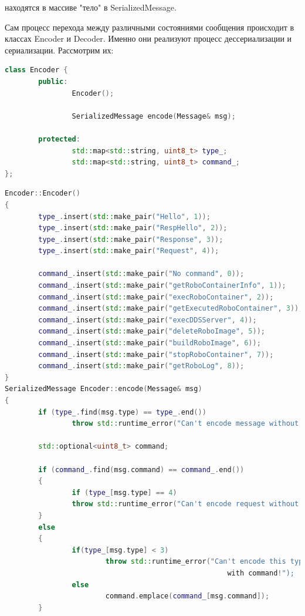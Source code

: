 \documentclass[a4paper, 14pt]{extreport}
\begin{document}
находятся в массиве "тело" в SerializedMessage.
\par Сам процесс перехода между различными состояниями сообщения происходит в классах Encoder и Decoder. Именно они реализуют процесс 
дессериализации и сериализации. Рассмотрим их:
\begin{lstlisting}[language=C++, frame=single, xleftmargin=15pt, caption={Заголовочный файл класса Encoder},label=DescriptiveLabel]
class Encoder {
        public:
                Encoder();
        
                SerializedMessage encode(Message& msg);
        
        protected:
                std::map<std::string, uint8_t> type_;
                std::map<std::string, uint8_t> command_;
};              
\end{lstlisting}
\begin{lstlisting}[language=C++, frame=single, xleftmargin=15pt, caption={Определение методов класса Encoder},label=DescriptiveLabel]
Encoder::Encoder()
{
        type_.insert(std::make_pair("Hello", 1));
        type_.insert(std::make_pair("RespHello", 2));
        type_.insert(std::make_pair("Response", 3));
        type_.insert(std::make_pair("Request", 4));

        command_.insert(std::make_pair("No command", 0));
        command_.insert(std::make_pair("getRoboContainerInfo", 1));
        command_.insert(std::make_pair("execRoboContainer", 2));
        command_.insert(std::make_pair("getExecutedRoboContainer", 3));
        command_.insert(std::make_pair("execDDSServer", 4));
        command_.insert(std::make_pair("deleteRoboImage", 5));
        command_.insert(std::make_pair("buildRoboImage", 6));
        command_.insert(std::make_pair("stopRoboContainer", 7));
        command_.insert(std::make_pair("getRoboLog", 8));
}
SerializedMessage Encoder::encode(Message& msg)
{
        if (type_.find(msg.type) == type_.end())
                throw std::runtime_error("Can't encode message without propriate type!");

        std::optional<uint8_t> command;

        if (command_.find(msg.command) == command_.end())
        {
                if (type_[msg.type] == 4)
                throw std::runtime_error("Can't encode request without command!");
        }
        else
        {
                if(type_[msg.type] < 3)
                        throw std::runtime_error("Can't encode this type of message
                                                     with command!");
                else
                        command.emplace(command_[msg.command]);
        }
        

\end{lstlisting}
\end{document}
